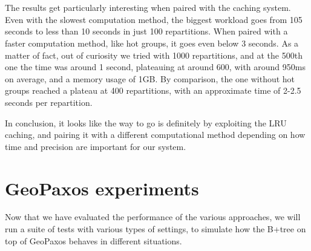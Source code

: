 \\\\
The results get particularly interesting when paired with the caching system. Even with the slowest computation method, the biggest workload goes from 105 seconds to less than 10 seconds in just 100 repartitions. When paired with a faster computation method, like hot groups, it goes even below 3 seconds. As a matter of fact, out of curiosity we tried with 1000 repartitions, and at the 500th one the time was around 1 second, plateauing at around 600, with around 950ms on average, and a memory usage of 1GB.
By comparison, the one without hot groups reached a plateau at 400 repartitions, with an approximate time of 2-2.5 seconds per repartition.

In conclusion, it looks like the way to go is definitely by exploiting the LRU caching, and pairing it with a different computational method depending on how time and precision are important for our system.

\chapter{GeoPaxos experiments}\label{sec:geopaxos-tests}
Now that we have evaluated the performance of the various approaches, we will run a suite of tests with various types of settings, to simulate how the B+tree on top of GeoPaxos behaves in different situations.

